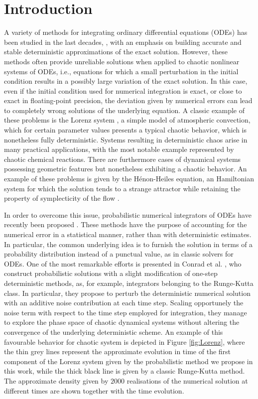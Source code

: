 \documentclass{siamart1116}
\numberwithin{theorem}{section}
\begin{document}
\section{Introduction} 
A variety of methods for integrating ordinary differential equations (ODEs) has been studied in the last decades, \cite{HNW93, HaW96, HLW06}, with an emphasis on building accurate and stable deterministic approximations of the exact solution. However, these methods often provide unreliable solutions when applied to chaotic nonlinear systems of ODEs, i.e., equations for which a small perturbation in the initial condition results in a possibly large variation of the exact solution. In this case, even if the initial condition used for numerical integration is exact, or close to exact in floating-point precision, the deviation given by numerical errors can lead to completely wrong solutions of the underlying equation. A classic example of these problems is the Lorenz system \cite{Lor63}, a simple model of atmospheric convection, which for certain parameter values presents a typical chaotic behavior, which is nonetheless fully deterministic. Systems resulting in deterministic chaos arise in many practical applications, with the most notable example represented by chaotic chemical reactions. There are furthermore cases of dynamical systems possessing geometric features but nonetheless exhibiting a chaotic behavior. An example of these problems is given by the Hénon-Heiles equation, an Hamiltonian system for which the solution tends to a strange attractor while retaining the property of symplecticity of the flow \cite{HeH64}.

In order to overcome this issue, probabilistic numerical integrators of ODEs have recently been proposed \cite{CGS16, KeH16}. These methods have the purpose of accounting for the numerical error in a statistical manner, rather than with deterministic estimates. In particular, the common underlying idea is to furnish the solution in terms of a probability distribution instead of a punctual value, as in classic solvers for ODEs. One of the most remarkable efforts is presented in Conrad et al. \cite{CGS16}, who construct probabilistic solutions with a slight modification of one-step deterministic methods, as, for example, integrators belonging to the Runge-Kutta class. In particular, they propose to perturb the deterministic numerical solution with an additive noise contribution at each time step. Scaling opportunely the noise term with respect to the time step employed for integration, they manage to explore the phase space of chaotic dynamical systems without altering the convergence of the underlying deterministic scheme. An example of this favourable behavior for chaotic system is depicted in Figure \ref{fig:Lorenz}, where the thin grey lines represent the approximate evolution in time of the first component of the Lorenz system given by the probabilistic method we propose in this work, while the thick black line is given by a classic Runge-Kutta method. The approximate density given by $2000$ realisations of the numerical solution at different times are shown together with the time evolution.
\end{document}
